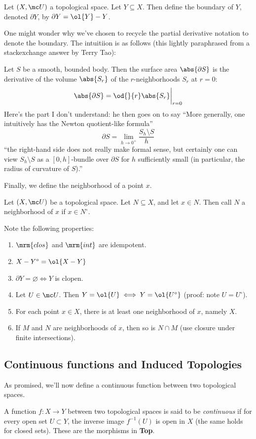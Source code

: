 \documentclass{fkbook}
\begin{document}
\begin{adjustwidth}{1em}{1em}
\begin{definition}
    Let $(X, \mc U)$ a topological space. Let $Y \subseteq X$. Then
    define the boundary of $Y$, denoted $\partial Y$, by $\partial Y =
    \ol{Y} - Y$.
  \end{definition}
  One might wonder why we've chosen to recycle the partial derivative
  notation to denote the boundary. The intuitiion is as follows (this
  lightly paraphrased from a stackexchange answer by Terry Tao):
  \begin{leftbar}
    Let $S$ be a smooth, bounded body. Then the surface area
    $\abs{\partial S}$ is the derivative of the volume $\abs{S_r}$ of
    the $r$-neighborhoods $S_r$ at $r = 0$:
    \[
      \abs{\partial S} = \od{}{r} \abs{S_r} \bigg\vert_{r=0}
    \]
    Here's the part I don't understand: he then goes on to say ``More
    generally, one intuitively has the Newton quotient-like formula''
    \[
      \partial S = \lim_{h \to 0^+} \frac{S_h \setminus S}{h}
    \]
    ``the right-hand side does not really make formal sense, but
    certainly one can view $S_h \setminus S$ as a $[0,h]$-bundle over
    $\partial S$ for $h$ sufficiently small (in particular, the radius
    of curvature of $S$).''
  \end{leftbar}
  Finally, we define the neighborhood of a point $x$.
  \begin{definition}[Neighborhood]
    Let $(X, \mc U)$ be a topological space. Let $N \subseteq X$, and
    let $x \in N$. Then call $N$ a neighborhood of $x$ if $x \in
    N^\circ$.
  \end{definition}
  Note the following properties:
  \begin{enumerate}[label=\arabic*.]
    \item $\mrm{clos}$ and $\mrm{int}$ are idempotent.
    \item $X - Y^\circ = \ol{X - Y}$
    \item $\partial Y = \varnothing \iff Y$ is clopen.
    \item Let $U \in \mc U$. Then $Y = \ol{U} \iff Y = \ol{U^\circ}$
      (proof: note $U = U^\circ$).
    \item For each point $x \in X$, there is at least one neighborhood
      of $x$, namely $X$.
    \item If $M$ and $N$ are neighborhoods of $x$, then so is $N \cap
      M$ (use closure under finite intersections).
  \end{enumerate}
  \subsection{Continuous functions and Induced Topologies}
  As promised, we'll now define a continuous function between two
  topological spaces.
  \begin{definition}
    A function $f : X \to Y$ between two topological spaces is said to
    be \emph{continuous} if for every open set $U \subset Y$, the
    inverse image $f^{-1}(U)$ is open in $X$ (the same holds for
    closed sets). These are the morphisms in \textbf{Top}.


\end{definition}
\end{adjustwidth}
\end{document}
